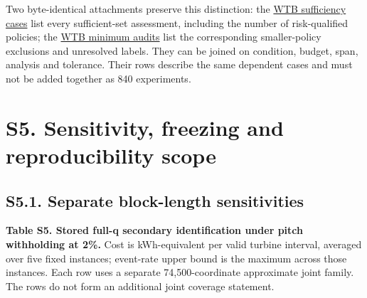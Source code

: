 \documentclass[
  british,
  11pt,
]{article}
\begin{document}
Two byte-identical attachments preserve this distinction: the
\href{supplement_data/wtb_all_420_sufficiency_cases.csv}{WTB sufficiency
cases} list every sufficient-set assessment, including the number of
risk-qualified policies; the
\href{supplement_data/wtb_all_420_minimum_cases.csv}{WTB minimum audits}
list the corresponding smaller-policy exclusions and unresolved labels.
They can be joined on condition, budget, span, analysis and tolerance.
Their rows describe the same dependent cases and must not be added
together as 840 experiments.


\section{S5. Sensitivity, freezing and reproducibility
scope}\label{s5.-sensitivity-freezing-and-reproducibility-scope}

\subsection{S5.1. Separate block-length
sensitivities}\label{s5.1.-separate-block-length-sensitivities}

\textbf{Table S5. Stored full-q secondary identification under pitch
withholding at 2\%.} Cost is kWh-equivalent per valid turbine interval,
averaged over five fixed instances; event-rate upper bound is the
maximum across those instances. Each row uses a separate
74,500-coordinate approximate joint family. The rows do not form an
additional joint coverage statement.
\end{document}
